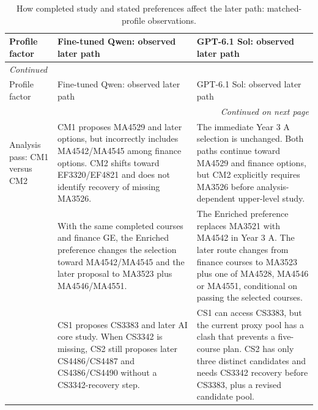 \documentclass{article}
\begin{document}
\newpage
{\small
\setlength{\tabcolsep}{4pt}
\renewcommand{\arraystretch}{1.12}
\begin{longtable}{p{1.05in}p{2.05in}p{2.05in}}
\caption{How completed study and stated preferences affect the later path: matched-profile observations.}\label{tab:future-effects06}\\
\toprule
Profile factor & Fine-tuned Qwen: observed later path & GPT-6.1 Sol: observed later path\\
\midrule
\endfirsthead
\multicolumn{3}{l}{\textit{Continued}}\\
\toprule
Profile factor & Fine-tuned Qwen: observed later path & GPT-6.1 Sol: observed later path\\
\midrule
\endhead
\midrule
\multicolumn{3}{r}{\textit{Continued on next page}}\\
\endfoot
\bottomrule
\endlastfoot
{\raggedright Analysis pass: CM1 versus CM2\par} & {\raggedright CM1 proposes MA4529 and later options, but incorrectly includes MA4542/MA4545 among finance options. CM2 shifts toward EF3320/EF4821 and does not identify recovery of missing MA3526.\par} & {\raggedright The immediate Year 3 A selection is unchanged. Both paths continue toward MA4529 and finance options, but CM2 explicitly requires MA3526 before analysis-dependent upper-level study.\par}\\
\addlinespace[5pt]
{\raggedright Explicit CM stream: CM1 versus CM3\par} & {\raggedright With the same completed courses and finance GE, the Enriched preference changes the selection toward MA4542/MA4545 and the later proposal to MA3523 plus MA4546/MA4551.\par} & {\raggedright The Enriched preference replaces MA3521 with MA4542 in Year 3 A. The later route changes from finance courses to MA3523 plus one of MA4528, MA4546 or MA4551, conditional on passing the selected courses.\par}\\
\addlinespace[5pt]
{\raggedright CS3342 pass: CS1 versus CS2\par} & {\raggedright CS1 proposes CS3383 and later AI core study. When CS3342 is missing, CS2 still proposes later CS4486/CS4487 and CS4386/CS4490 without a CS3342-recovery step.\par} & {\raggedright CS1 can access CS3383, but the current proxy pool has a clash that prevents a five-course plan. CS2 has only three distinct candidates and needs CS3342 recovery before CS3383, plus a revised candidate pool.\par}\\

\end{longtable}}
\end{document}
